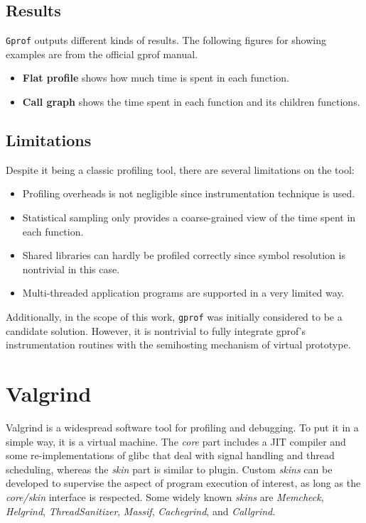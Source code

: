 \subsection{Results}
\texttt{Gprof} outputs different kinds of results. The following figures for showing examples are from the official gprof manual\cite{gprof}. 

\begin{itemize}
    \item \textbf{Flat profile} shows how much time is spent in each function.
    \item \textbf{Call graph} shows the time spent in each function and its children functions.  
\end{itemize}

\subsection{Limitations}
Despite it being a classic profiling tool, there are several limitations on the tool:

\begin{itemize}
    \item Profiling overheads is not negligible since instrumentation technique is used.
    \item Statistical sampling only provides a coarse-grained view of the time spent in each function.
    \item Shared libraries can hardly be profiled correctly since symbol resolution is nontrivial in this case.
    \item Multi-threaded application programs are supported in a very limited way.
\end{itemize}

Additionally, in the scope of this work, \texttt{gprof} was initially considered to be a candidate solution. However, it is nontrivial to fully integrate gprof's instrumentation routines with the semihosting mechanism of virtual prototype. 

\section{Valgrind}
Valgrind is a widespread software tool for profiling and debugging. To put it in a simple way, it is a virtual machine. The \textit{core} part includes a \ac{JIT} compiler and some re-implementations of glibc that deal with signal handling and thread scheduling, whereas the \textit{skin} part is similar to plugin. Custom \textit{skins} can be developed to supervise the aspect of program execution of interest, as long as the \textit{core/skin} interface is respected. Some widely known \textit{skins} are \textit{Memcheck}, \textit{Helgrind}, \textit{ThreadSanitizer}, \textit{Massif}, \textit{Cachegrind}, and \textit{Callgrind}.

